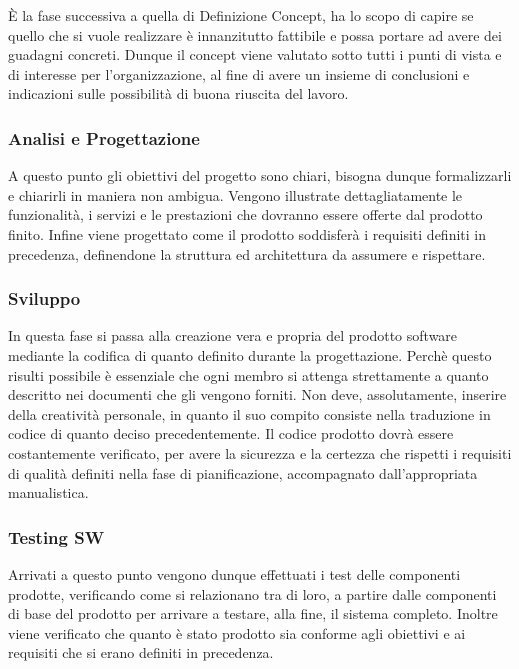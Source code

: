 È la fase successiva a quella di Definizione Concept, ha lo scopo di capire se quello che si vuole realizzare è innanzitutto fattibile e possa portare ad avere dei guadagni concreti. Dunque il concept viene valutato sotto tutti i punti di vista e di interesse per l’organizzazione, al fine di avere un insieme di conclusioni e indicazioni sulle possibilità di buona riuscita del lavoro.

 \subsubsection{Analisi e Progettazione}

A questo punto gli obiettivi del progetto sono chiari, bisogna dunque formalizzarli e chiarirli in maniera non ambigua. 
Vengono illustrate dettagliatamente le funzionalità, i servizi e le prestazioni che dovranno essere offerte dal prodotto finito. 
Infine viene progettato come il prodotto soddisferà i requisiti definiti in precedenza, definendone la struttura ed architettura da assumere e rispettare.

 \subsubsection{Sviluppo }

In questa fase si passa alla creazione vera e propria del prodotto software mediante la codifica di quanto definito durante la progettazione. Perchè questo risulti possibile è essenziale che ogni membro si attenga strettamente a quanto descritto nei documenti che gli vengono forniti. Non deve, assolutamente, inserire della creatività personale, in quanto il suo compito consiste nella traduzione in codice di quanto deciso precedentemente.
Il codice prodotto dovrà essere costantemente verificato, per avere la sicurezza e la certezza che rispetti i requisiti di qualità definiti nella fase di pianificazione, accompagnato dall’appropriata manualistica.

 \subsubsection{Testing SW} 

Arrivati a questo punto vengono dunque effettuati i test delle componenti prodotte, verificando come si relazionano tra di loro, a partire dalle componenti di base del prodotto per arrivare a testare, alla fine, il
sistema completo.
Inoltre viene verificato che quanto è stato prodotto sia conforme agli obiettivi e ai requisiti che si erano definiti in precedenza.

